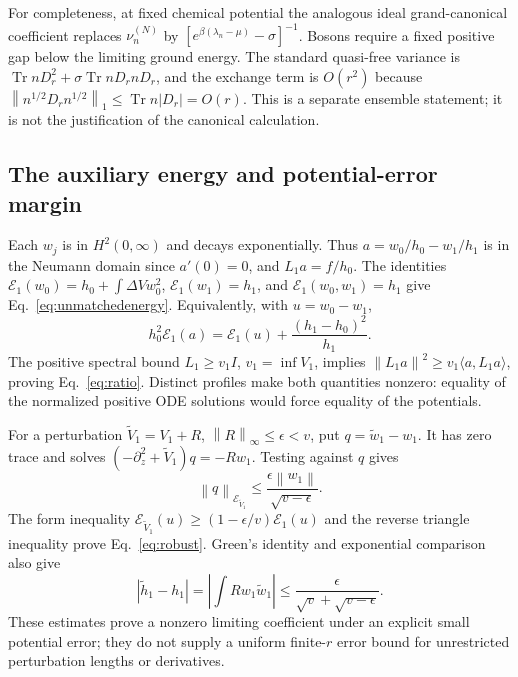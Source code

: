 \documentclass[aps,pra,reprint,superscriptaddress,longbibliography]{revtex4-2}
\newcommand{\Tr}{\operatorname{Tr}}
\newcommand{\calE}{\mathcal E}
\newcommand{\norm}[1]{\left\lVert#1\right\rVert}
\begin{document}
For completeness, at fixed chemical potential the analogous ideal grand-canonical coefficient replaces $\nu_n^{(N)}$ by $[e^{\beta(\lambda_n-\mu)}-\sigma]^{-1}$. Bosons require a fixed positive gap below the limiting ground energy. The standard quasi-free variance is $\Tr nD_r^2+\sigma\Tr nD_rnD_r$, and the exchange term is $O(r^2)$ because $\norm{n^{1/2}D_rn^{1/2}}_1\le\Tr n|D_r|=O(r)$. This is a separate ensemble statement; it is not the justification of the canonical calculation.

\subsection{The auxiliary energy and potential-error margin}

Each $w_j$ is in $H^2(0,\infty)$ and decays exponentially. Thus $a=w_0/h_0-w_1/h_1$ is in the Neumann domain since $a'(0)=0$, and $L_1a=f/h_0$. The identities $\calE_1(w_0)=h_0+\int\Delta Vw_0^2$, $\calE_1(w_1)=h_1$, and $\calE_1(w_0,w_1)=h_1$ give Eq.~\eqref{eq:unmatchedenergy}. Equivalently, with $u=w_0-w_1$,
\begin{equation}
 h_0^2\calE_1(a)=\calE_1(u)+\frac{(h_1-h_0)^2}{h_1}.
 \label{eq:decomposition}
\end{equation}
The positive spectral bound $L_1\ge v_1I$, $v_1=\inf V_1$, implies $\norm{L_1a}^2\ge v_1\langle a,L_1a\rangle$, proving Eq.~\eqref{eq:ratio}. Distinct profiles make both quantities nonzero: equality of the normalized positive ODE solutions would force equality of the potentials.

For a perturbation $\widetilde V_1=V_1+R$, $\norm R_\infty\le\epsilon<v$, put $q=\widetilde w_1-w_1$. It has zero trace and solves $(-\partial_z^2+\widetilde V_1)q=-Rw_1$. Testing against $q$ gives
\begin{equation}
 \norm q_{\calE_{\widetilde V_1}}
              \le\frac{\epsilon\norm{w_1}}{\sqrt{v-\epsilon}}.
\end{equation}
The form inequality $\calE_{\widetilde V_1}(u)\ge(1-\epsilon/v)\calE_1(u)$ and the reverse triangle inequality prove Eq.~\eqref{eq:robust}. Green's identity and exponential comparison also give
\begin{equation}
 |\widetilde h_1-h_1|=\left|\int Rw_1\widetilde w_1\right|
       \le\frac{\epsilon}{\sqrt v+\sqrt{v-\epsilon}}.
\end{equation}
These estimates prove a nonzero limiting coefficient under an explicit small potential error; they do not supply a uniform finite-$r$ error bound for unrestricted perturbation lengths or derivatives.
\end{document}
